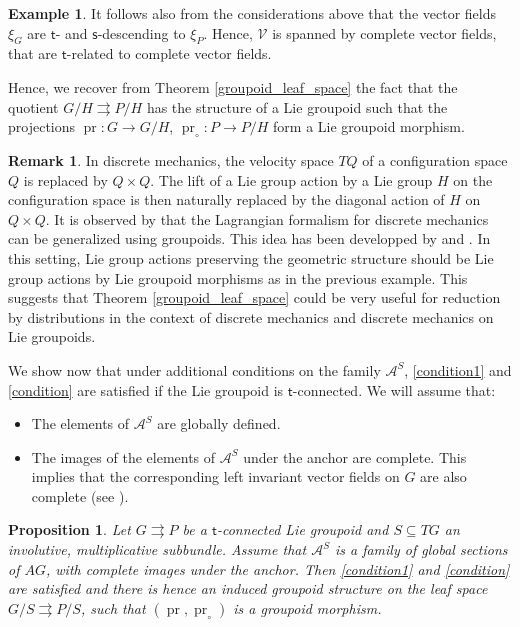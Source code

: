 \documentclass{amsart}
\newtheorem{proposition}[theorem]{Proposition}
\theoremstyle{definition}
\newtheorem{remark}[theorem]{Remark}
\newtheorem{example}[theorem]{Example}
\begin{document}
\begin{example}
It follows also from the considerations above that the vector fields $\xi_G$ are ${{\mathsf{t}}}$-
and ${{\mathsf{s}}}$-descending 
to $\xi_P$. Hence, ${{\mathcal{V}}}$ is spanned by complete vector fields, that are ${{\mathsf{t}}}$-related
to complete vector fields.

Hence, we recover from Theorem \ref{groupoid_leaf_space}
the fact that
the quotient $G/H{{\rightrightarrows}} P/H$ has the structure of a Lie groupoid
such that the projections 
$\operatorname{pr}:G\to G/H$, $\operatorname{pr}_\circ:P\to P/H$
form a Lie groupoid morphism. 
\end{example}

\begin{remark}\label{geom_mech_remark}
In discrete mechanics, the velocity space $TQ$ of a configuration space 
$Q$ is replaced by $Q\times Q$.
The lift of a Lie group action by a Lie group $H$ on the configuration space is then naturally 
replaced by the diagonal action of $H$ on $Q\times Q$.
 It is observed by 
\cite{Weinstein96} that the Lagrangian formalism
for discrete mechanics can be generalized using groupoids.
This idea has been developped by \cite{MaMaMa06} and \cite{IgMaMaMa08}. In this setting, 
Lie group actions preserving the geometric structure should be 
Lie group actions by Lie groupoid morphisms as in the previous example.
This suggests that Theorem \ref{groupoid_leaf_space} could be  very useful
for reduction by distributions in the context of discrete mechanics and discrete mechanics 
on Lie groupoids.
\end{remark}

\bigskip
We show now that under
 additional conditions on the family $\mathcal A^S$, 
\eqref{condition1} and \eqref{condition} are satisfied if the 
 Lie groupoid is ${{\mathsf{t}}}$-connected.
We will assume that:
\begin{itemize}
\item The elements of $\mathcal A^S$ are globally defined. 
\item The images of the elements of $\mathcal A^S$ under the anchor are complete.
This implies that the corresponding left invariant vector fields 
on $G$ are also complete (see \cite[Theorem 3.6.4]{Mackenzie05}). 
\end{itemize}
\begin{proposition}\label{annoying}
 Let $G{{\rightrightarrows}} P$ be a ${{\mathsf{t}}}$-connected Lie groupoid and $S\subseteq TG$ an  involutive, multiplicative 
subbundle. Assume that $\mathcal A^S$ is a family of \emph{global} sections of $AG$, with \emph{complete} 
images under the anchor. 
Then \eqref{condition1} and  \eqref{condition} are satisfied and there is hence an induced groupoid structure
on the leaf space $G/S{{\rightrightarrows}} P/S$, such that 
$(\operatorname{pr},\operatorname{pr}_\circ)$ is a groupoid morphism.
\end{proposition}
\end{document}
